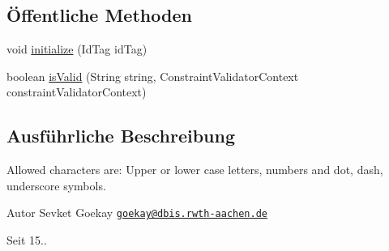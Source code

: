 \subsection*{Öffentliche Methoden}
\begin{DoxyCompactItemize}
\item 
void \hyperlink{classde_1_1rwth_1_1idsg_1_1steve_1_1web_1_1validation_1_1_id_tag_validator_a027044d6b6433adce002c3d1959150b4}{initialize} (Id\+Tag id\+Tag)
\item 
boolean \hyperlink{classde_1_1rwth_1_1idsg_1_1steve_1_1web_1_1validation_1_1_id_tag_validator_af462861b25067836951b7e0651a1fce7}{is\+Valid} (String string, Constraint\+Validator\+Context constraint\+Validator\+Context)
\end{DoxyCompactItemize}


\subsection{Ausführliche Beschreibung}
Allowed characters are\+: Upper or lower case letters, numbers and dot, dash, underscore symbols.

\begin{DoxyAuthor}{Autor}
Sevket Goekay \href{mailto:goekay@dbis.rwth-aachen.de}{\tt goekay@dbis.\+rwth-\/aachen.\+de} 
\end{DoxyAuthor}
\begin{DoxySince}{Seit}
15.. 
\end{DoxySince}


